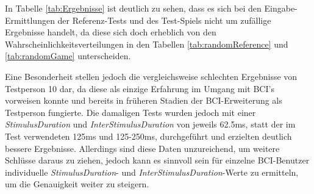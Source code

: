 \pagebreak

In Tabelle \ref{tab:Ergebnisse} ist deutlich zu sehen, dass es sich bei den Eingabe-Ermittlungen der Referenz-Tests und des Test-Spiels nicht um zufällige Ergebnisse handelt,
da diese sich doch erheblich von den Wahrscheinlichkeitsverteilungen in den Tabellen \ref{tab:randomReference} und \ref{tab:randomGame} unterscheiden.

Eine Besonderheit stellen jedoch die vergleichsweise schlechten Ergebnisse von Testperson 10 dar, 
da diese als einzige Erfahrung im Umgang mit \acs{BCI}'s vorweisen konnte und bereits in früheren Stadien der \acs{BCI}-Erweiterung als Testperson fungierte.
Die damaligen Tests wurden jedoch mit einer \textit{StimulusDuration} und \textit{InterStimulusDuration} von jeweils 62.5ms, 
statt der im Test verwendeten 125ms und 125-250ms, durchgeführt und erzielten deutlich bessere Ergebnisse.
Allerdings sind diese Daten unzureichend, um weitere Schlüsse daraus zu ziehen, 
jedoch kann es sinnvoll sein für einzelne \acs{BCI}-Benutzer individuelle \textit{StimulusDuration}- und \mbox{\textit{InterStimulusDuration}}-Werte zu ermitteln, 
um die Genauigkeit weiter zu steigern.\\




